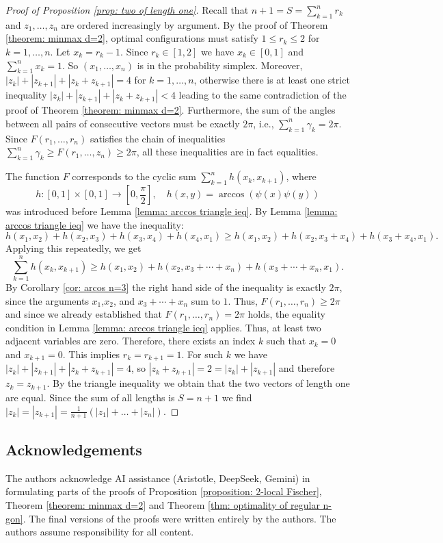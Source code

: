 \documentclass[reqno,hidelinks,11pt]{amsart}
\numberwithin{equation}{section}
\begin{document}
\begin{proof}[Proof of Proposition \ref{prop: two of length one}]
    Recall that $n+1=S=\sum_{k=1}^n r_k$ and $z_1,\ldots,z_n$ are ordered increasingly by argument. By the proof of Theorem \ref{theorem: minmax d=2}, optimal configurations must satisfy $1\le r_k\le 2$ for $k=1,\dots,n$.
    Let $x_k = r_k-1$. Since $r_k \in [1,2]$ we have $x_k \in [0,1]$ and $\sum_{k=1}^n x_k = 1$. So $(x_1,\dots,x_n)$ is in the probability simplex.
    Moreover, $|z_k|+|z_{k+1}|+|z_k+z_{k+1}|=4$ for $k=1,\dots,n$, otherwise there is at least one strict inequality $|z_k|+|z_{k+1}|+|z_k+z_{k+1}|<4$ leading to the same contradiction of the proof of Theorem \ref{theorem: minmax d=2}. 
    Furthermore, the sum of the angles between all pairs of consecutive vectors must be exactly $2\pi$, i.e., $\sum_{k=1}^n \gamma_k = 2\pi$.
    Since $F(r_1,\ldots,r_n)$ satisfies the chain of inequalities $\sum_{k=1}^n \gamma_k\ge F(r_1,\ldots,z_n)\ge2\pi$, all these inequalities are in fact equalities.
    
    The function $F$ corresponds to the cyclic sum $\sum_{k=1}^n h(x_k, x_{k + 1})$, where 
    \[
    h : [0,1] \times [0,1] \to [0,\frac{\pi}{2}], \quad h(x,y)=\arccos(\psi(x)\psi(y))\]
    was introduced before Lemma \ref{lemma: arccos triangle ieq}. By Lemma \ref{lemma: arccos triangle ieq} we have the inequality: 
    \[ h(x_1,x_2)+h(x_2,x_3)+h(x_3,x_4)+h(x_4,x_1) \geq h(x_1,x_2) + h(x_2,x_3+x_4)+h(x_3+x_4,x_1).\]
    Applying this repeatedly, we get
    \[
    \sum_{k=1}^n h(x_k, x_{k+1}) \geq h(x_1, x_2) + h(x_2, x_3 + \cdots + x_n) + h(x_3 + \cdots +x_n, x_1).
    \]
    By Corollary \ref{cor: arcos n=3} the right hand side of the inequality is exactly $2\pi$, since the arguments $x_1$,$x_2$, and $x_3+\cdots+x_n$ sum to $1$. Thus, $F(r_1,\dots,r_n) \geq 2\pi$ and since we already established that $F(r_1,\dots,r_n) = 2\pi$ holds, the equality condition in Lemma \ref{lemma: arccos triangle ieq} applies. 
    Thus, at least two adjacent variables are zero. Therefore, there exists an index $k$ such that $x_k=0$ and $x_{k+1}=0$. This implies $r_k=r_{k+1}=1$. 
    For such $k$ we have $|z_k|+|z_{k+1}|+|z_k+z_{k+1}|=4$, so $|z_k+z_{k+1}|=2=|z_k|+|z_{k+1}|$ and therefore $z_k=z_{k+1}$.
    By the triangle inequality we obtain that the two vectors of length one are equal. Since the sum of all lengths is $S=n+1$ we find $|z_k|=|z_{k+1}|=\frac{1}{n+1}(|z_1|+\dots+|z_n|)$.
\end{proof}

\subsection*{Acknowledgements}

The authors acknowledge AI assistance (Aristotle, DeepSeek, Gemini) in formulating parts of the proofs of Proposition \ref{proposition: 2-local Fischer}, Theorem \ref{theorem: minmax d=2} and Theorem \ref{thm: optimality of regular n-gon}. The final versions of the proofs were written entirely by the authors. The authors assume responsibility for all content.

\printbibliography
\end{document}
